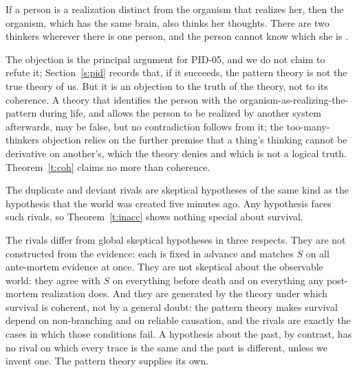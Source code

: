 \documentclass{situationist-preprint}
\begin{document}
\begin{objection}\label{o:olson}
If a person is a realization distinct from the organism that realizes her, then the organism, which has the same brain, also thinks her thoughts. There are two thinkers wherever there is one person, and the person cannot know which she is \citep{Olson1997}.
\end{objection}

\begin{reply}
The objection is the principal argument for PID-05, and we do not claim to refute it; Section~\ref{s:pid} records that, if it succeeds, the pattern theory is not the true theory of us. But it is an objection to the truth of the theory, not to its coherence. A theory that identifies the person with the organism-as-realizing-the-pattern during life, and allows the person to be realized by another system afterwards, may be false, but no contradiction follows from it; the too-many-thinkers objection relies on the further premise that a thing's thinking cannot be derivative on another's, which the theory denies and which is not a logical truth. Theorem~\ref{t:coh} claims no more than coherence.
\end{reply}

\begin{objection}\label{o:adhoc}
The duplicate and deviant rivals are skeptical hypotheses of the same kind as the hypothesis that the world was created five minutes ago. Any hypothesis faces such rivals, so Theorem~\ref{t:inacc} shows nothing special about survival.
\end{objection}

\begin{reply}
The rivals differ from global skeptical hypotheses in three respects. They are not constructed from the evidence: each is fixed in advance and matches $S$ on all ante-mortem evidence at once. They are not skeptical about the observable world: they agree with $S$ on everything before death and on everything any post-mortem realization does. And they are generated by the theory under which survival is coherent, not by a general doubt: the pattern theory makes survival depend on non-branching and on reliable causation, and the rivals are exactly the cases in which those conditions fail. A hypothesis about the past, by contrast, has no rival on which every trace is the same and the past is different, unless we invent one. The pattern theory supplies its own.
\end{reply}
\end{document}
